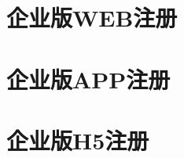 
\section{企业版WEB注册} 
\label{sec:reg_web}


\section{企业版APP注册} 
\label{sec:reg_app}


\section{企业版H5注册} 
\label{sec:reg_h5}

